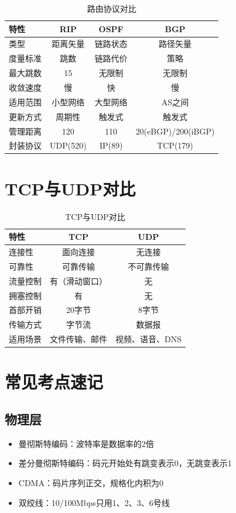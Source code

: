 \begin{table}[htbp]
\centering\small
\begin{tabular}{lccc}
\toprule
\textbf{特性} & \textbf{RIP} & \textbf{OSPF} & \textbf{BGP} \\
\midrule
类型 & 距离矢量 & 链路状态 & 路径矢量 \\
度量标准 & 跳数 & 链路代价 & 策略 \\
最大跳数 & 15 & 无限制 & 无限制 \\
收敛速度 & 慢 & 快 & 慢 \\
适用范围 & 小型网络 & 大型网络 & AS之间 \\
更新方式 & 周期性 & 触发式 & 触发式 \\
管理距离 & 120 & 110 & 20(eBGP)/200(iBGP) \\
封装协议 & UDP(520) & IP(89) & TCP(179) \\
\bottomrule
\end{tabular}
\caption{路由协议对比}
\end{table}

\section{TCP与UDP对比}

\begin{table}[htbp]
\centering
\begin{tabular}{lcc}
\toprule
\textbf{特性} & \textbf{TCP} & \textbf{UDP} \\
\midrule
连接性 & 面向连接 & 无连接 \\
可靠性 & 可靠传输 & 不可靠传输 \\
流量控制 & 有（滑动窗口） & 无 \\
拥塞控制 & 有 & 无 \\
首部开销 & 20字节 & 8字节 \\
传输方式 & 字节流 & 数据报 \\
适用场景 & 文件传输、邮件 & 视频、语音、DNS \\
\bottomrule
\end{tabular}
\caption{TCP与UDP对比}
\end{table}

\section{常见考点速记}

\subsection{物理层}
\begin{itemize}[leftmargin=2em,itemsep=0pt]
    \item 曼彻斯特编码：波特率是数据率的2倍
    \item 差分曼彻斯特编码：码元开始处有跳变表示0，无跳变表示1
    \item CDMA：码片序列正交，规格化内积为0
    \item 双绞线：10/100Mbps只用1、2、3、6号线
\end{itemize}

